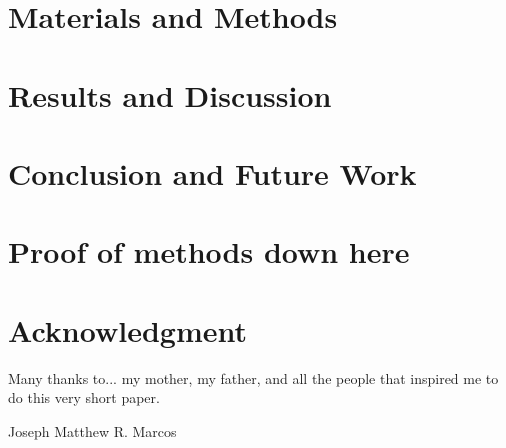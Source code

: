\documentclass[journal]{./IEEE/IEEEtran}
\newcommand{\ADVISEE}{Joseph Matthew R. Marcos}
\begin{document}
\section{Materials and Methods}

\section{Results and Discussion}
\section{Conclusion and Future Work}
\appendices

\section{Proof of methods down here}

\section{}

\section*{Acknowledgment}
Many thanks to... my mother, my father, and all the people that inspired me to do this very short paper.

\begin{biography}{\ADVISEE}
\end{biography}


\newpage
% 


\end{document}
